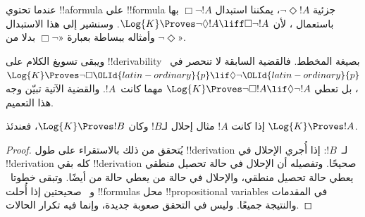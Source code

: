 \documentclass[../../../include/open-logic-section]{subfiles}
\begin{document}
عندما تحتوي !!a{formula} على !!{formula} جزئية $\lnot\Diamond !A$،
يمكننا استبدال $\Box\lnot !A$ بها باستعمال ،
لأن $\Log{K} \Proves \lnot\Diamond !A \liff \Box\lnot !A$. وسنشير
إلى هذا الاستبدال وأمثاله ببساطة بعبارة «$\Box\lnot$ بدلا من
$\lnot\Diamond$».

ويبقى تسويغ الكلام على !!{derivability} بصيغة المخطط.
فالقضية السابقة لا تنحصر في~$\Log{K} \Proves \lnot\Box {\OLId{latin-ordinary}{p}} \lif
\Diamond \lnot {\OLId{latin-ordinary}{p}}$، بل تعطي
$\Log{K} \Proves \lnot\Box !A \lif \Diamond \lnot !A$
مهما كانت~$!A$. والقضية الآتية تبيّن وجه هذا التعميم.

\begin{prop}
  إذا كانت $!A$ مثال إحلال لـ$!B$ وكان $\Log{K} \Proves !B$، فعندئذ
  $\Log{K} \Proves !A$.
\end{prop}

\begin{proof}
  يُتحقق من ذلك بالاستقراء على طول !!{derivation} لـ~$!B$:
  إذا أُجري الإحلال في !!{derivation} كله بقي !!{derivation}
  صحيحًا. وتفصيله أن الإحلال في حالة تحصيل منطقي يعطي حالة
  تحصيل منطقي، والإحلال في حالة من
   يعطي حالة من
   أيضًا.
  وتبقى خطوتا~\MP{} و~\Nec{} صحيحتين إذا أُحلت !!{formula}s
  محل !!{propositional variable}s في المقدمات والنتيجة جميعًا.
  وليس في التحقق صعوبة جديدة، وإنما فيه تكرار الحالات.
\end{proof}
\end{document}
